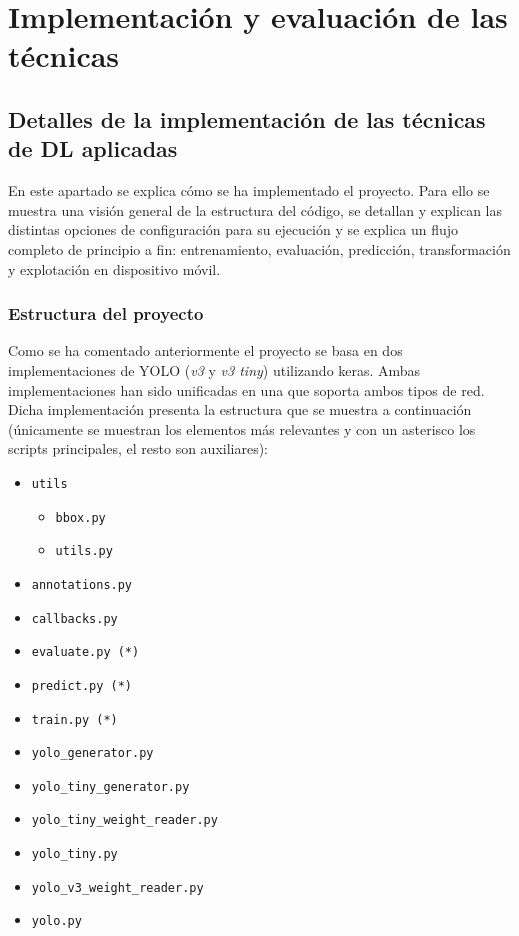 \section{Implementación y evaluación de las técnicas}
\label{sec:implementacion_y_evaluacion_de_las_tecnicas}

\subsection{Detalles de la implementación de las técnicas de DL aplicadas}

En este apartado se explica cómo se ha implementado el proyecto. Para ello se muestra una visión general de la estructura del código, se detallan y explican las distintas opciones de configuración para su ejecución y se explica un flujo completo de principio a fin: entrenamiento, evaluación, predicción, transformación y explotación en dispositivo móvil.

\subsubsection*{Estructura del proyecto}

Como se ha comentado anteriormente el proyecto se basa en dos implementaciones de YOLO (\textit{v3} y \textit{v3 tiny}) utilizando keras. Ambas implementaciones han sido unificadas en una \cite{s3_yolo_dicastro} que soporta ambos tipos de red. Dicha implementación presenta la estructura que se muestra a continuación (únicamente se muestran los elementos más relevantes y con un asterisco los scripts principales, el resto son auxiliares):

\begin{itemize}
	\item \texttt{utils}
	\begin{itemize}
		\item \texttt{bbox.py}
		\item \texttt{utils.py}
	\end{itemize}
	\item \texttt{annotations.py}
	\item \texttt{callbacks.py}
	\item \texttt{evaluate.py (*)}
	\item \texttt{predict.py (*)}
	\item \texttt{train.py (*)}
	\item \texttt{yolo\_generator.py}
	\item \texttt{yolo\_tiny\_generator.py}
	\item \texttt{yolo\_tiny\_weight\_reader.py}
	\item \texttt{yolo\_tiny.py}
	\item \texttt{yolo\_v3\_weight\_reader.py}
	\item \texttt{yolo.py}
\end{itemize}

